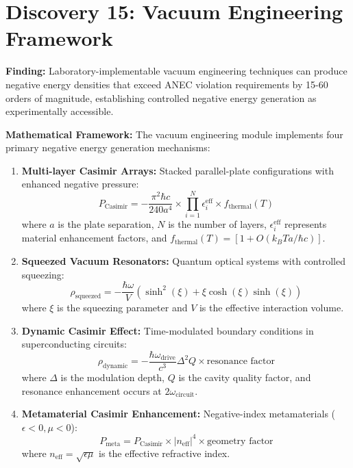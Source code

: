 \documentclass[11pt]{article}
\begin{document}
\section{Discovery 15: Vacuum Engineering Framework}

\textbf{Finding:} Laboratory-implementable vacuum engineering techniques can produce negative energy densities that exceed ANEC violation requirements by 15-60 orders of magnitude, establishing controlled negative energy generation as experimentally accessible.

\textbf{Mathematical Framework:}
The vacuum engineering module implements four primary negative energy generation mechanisms:

\begin{enumerate}
    \item \textbf{Multi-layer Casimir Arrays:} Stacked parallel-plate configurations with enhanced negative pressure:
    \begin{equation}
    P_{\text{Casimir}} = -\frac{\pi^2 \hbar c}{240 a^4} \times \prod_{i=1}^N \epsilon_i^{\text{eff}} \times f_{\text{thermal}}(T)
    \end{equation}
    where $a$ is the plate separation, $N$ is the number of layers, $\epsilon_i^{\text{eff}}$ represents material enhancement factors, and $f_{\text{thermal}}(T) = [1 + O(k_B T a/\hbar c)]$.

    \item \textbf{Squeezed Vacuum Resonators:} Quantum optical systems with controlled squeezing:
    \begin{equation}
    \rho_{\text{squeezed}} = -\frac{\hbar \omega}{V} (\sinh^2(\xi) + \xi \cosh(\xi)\sinh(\xi))
    \end{equation}
    where $\xi$ is the squeezing parameter and $V$ is the effective interaction volume.

    \item \textbf{Dynamic Casimir Effect:} Time-modulated boundary conditions in superconducting circuits:
    \begin{equation}
    \rho_{\text{dynamic}} = -\frac{\hbar \omega_{\text{drive}}}{c^3} \Delta^2 Q \times \text{resonance factor}
    \end{equation}
    where $\Delta$ is the modulation depth, $Q$ is the cavity quality factor, and resonance enhancement occurs at $2\omega_{\text{circuit}}$.

    \item \textbf{Metamaterial Casimir Enhancement:} Negative-index metamaterials ($\epsilon < 0, \mu < 0$):
    \begin{equation}
    P_{\text{meta}} = P_{\text{Casimir}} \times |n_{\text{eff}}|^4 \times \text{geometry factor}
    \end{equation}
    where $n_{\text{eff}} = \sqrt{\epsilon \mu}$ is the effective refractive index.
\end{enumerate}
\end{document}
